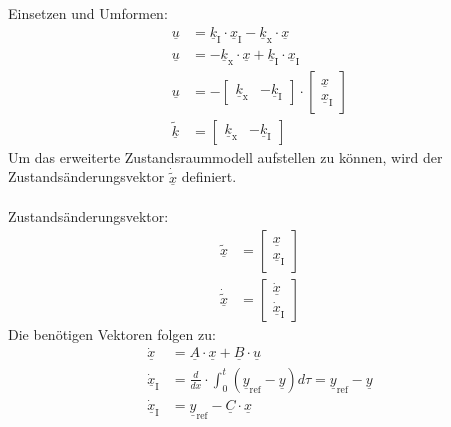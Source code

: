 Einsetzen und Umformen:
\begin{align}
    \underline{u} &= \underline{k}_{\mathrm{I}}\cdot\underline{x}_{\mathrm{I}}-\underline{k}_{\mathrm{x}}\cdot\underline{x} \nonumber \\
    \underline{u} &= -\underline{k}_{\mathrm{x}}\cdot\underline{x}+\underline{k}_{\mathrm{I}}\cdot\underline{x}_{\mathrm{I}} \nonumber\\
    \underline{u} &= -
    \begin{bmatrix}
        \underline{k}_{\mathrm{x}} & -\underline{k}_{\mathrm{I}}
    \end{bmatrix}
    \cdot
    \begin{bmatrix}
        \underline{x} \\
        \underline{x}_{\mathrm{I}}
    \end{bmatrix} \label{eq:Gleichung61} \\
    \underline{\tilde{k}} &= 
    \begin{bmatrix}
        \underline{k}_{\mathrm{x}} & -\underline{k}_{\mathrm{I}}
    \end{bmatrix} \label{eq:Gleichung62}
\end{align}
\newline
Um das erweiterte Zustandsraummodell aufstellen zu können, wird der Zustandsänderungsvektor $\underline{\dot{\tilde{x}}}$ definiert.\\\\
Zustandsänderungsvektor:
\begin{align}
    \underline{\tilde{x}} &=
    \begin{bmatrix}
        \underline{x} \\
        \underline{x}_{\mathrm{I}}
    \end{bmatrix} \nonumber \\
    \underline{\dot{\tilde{x}}} &= 
    \begin{bmatrix}
        \underline{\dot{x}} \\
        \underline{\dot{x}}_{\mathrm{I}}
    \end{bmatrix} \label{eq:Gleichung63}
\end{align}
\newline
Die benötigen Vektoren folgen zu:
\begin{align}
    \underline{\dot{x}} &= \underline{A}\cdot\underline{x}+\underline{B}\cdot\underline{u} \label{eq:Gleichung64}\\
    \underline{\dot{x}}_{\mathrm{I}} &= \frac{d}{dx}\cdot\int_{0}^t(\underline{y}_{\mathrm{ref}}-\underline{y})d\tau = \underline{y}_{\mathrm{ref}}-\underline{y} \nonumber \\
    \underline{\dot{x}}_{\mathrm{I}} &= \underline{y}_{\mathrm{ref}}-\underline{C}\cdot\underline{x} \label{eq:Gleichung65}
\end{align}
